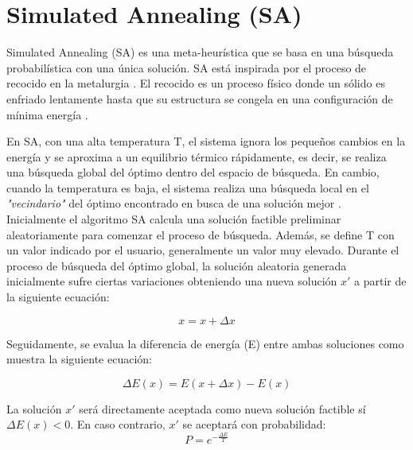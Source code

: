 
\newpage
\section{Simulated Annealing (SA)}
\label{sec:SA}

Simulated Annealing (SA) \cite{SA1, SA2, SA3} es una meta-heurística que se basa en una búsqueda probabilística con una única solución. SA está inspirada por el proceso de recocido en la metalurgia \cite{metabook}. El recocido es un proceso físico donde un sólido es enfriado lentamente hasta que su estructura se congela en una configuración de mínima energía \cite{metabook}.

En SA, con una alta temperatura T, el sistema ignora los pequeños cambios en la energía y se aproxima a un equilibrio térmico rápidamente, es decir, se realiza una búsqueda global del óptimo dentro del espacio de búsqueda. En cambio, cuando la temperatura es baja, el sistema realiza una búsqueda local en el \textit{"vecindario"} del óptimo encontrado en busca de una solución mejor \cite{metabook}. \\

Inicialmente el algoritmo SA calcula una solución factible preliminar aleatoriamente para comenzar el proceso de búsqueda. Además, se define T con un valor indicado por el usuario, generalmente un valor muy elevado.
Durante el proceso de búsqueda del óptimo global, la solución aleatoria generada inicialmente sufre ciertas variaciones obteniendo una nueva solución $x'$ a partir de la siguiente ecuación: 

\begin{equation}\label{eq:perturbation}
    x = x + \Delta x
\end{equation}

Seguidamente, se evalua la diferencia de energía (E) entre ambas soluciones como muestra la siguiente ecuación:

\begin{equation}\label{eq:evaluate}
    \Delta E(x) = E(x + \Delta x) - E(x)
\end{equation}

La solución $x'$ será directamente aceptada como nueva solución factible sí \\ $\Delta E(x) < 0$. En caso contrario, $x'$ se aceptará con probabilidad: \\

\begin{equation}\label{eq:other}
    P = e^{- \frac{\Delta E}{T}}
\end{equation}

